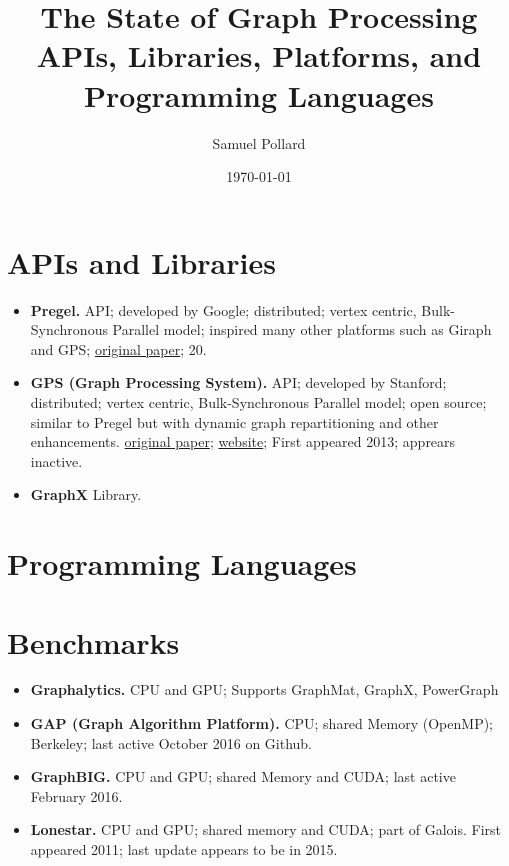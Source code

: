 \documentclass[11pt]{article}
\begin{document}
\title{The State of Graph Processing \\ \large APIs, Libraries, Platforms, and Programming Languages \vspace{-1em}}
\author{Samuel Pollard}
\date{\today}
\maketitle

\section{APIs and Libraries}
\begin{itemize}
	\item \textbf{Pregel.} API; developed by Google; distributed; vertex centric, Bulk-Synchronous Parallel model; inspired many other platforms such as Giraph and GPS; \href{http://dl.acm.org/citation.cfm?id=1807184}{original paper}; 20.
	
	\item \textbf{GPS (Graph Processing System).} API; developed by Stanford; distributed; vertex centric, Bulk-Synchronous Parallel model; open source; similar to Pregel but with dynamic graph repartitioning and other enhancements. \href{http://ilpubs.stanford.edu:8090/1039/7/gps_ssdbm.pdf}{original paper}; \href{http://infolab.stanford.edu/gps/}{website}; First appeared 2013; apprears inactive.
	
	\item \textbf{GraphX} Library.
\end{itemize}

\section{Programming Languages}

\section{Benchmarks}
\begin{itemize}
	\item \textbf{Graphalytics.} CPU and GPU; Supports GraphMat, GraphX, PowerGraph
	\item \textbf{GAP (Graph Algorithm Platform).} CPU; shared Memory (OpenMP); Berkeley; last active October 2016 on Github.
	\item \textbf{GraphBIG.} CPU and GPU; shared Memory and CUDA; last active February 2016.
	\item \textbf{Lonestar.} CPU and GPU; shared memory and CUDA; part of Galois. First appeared 2011; last update appears to be in 2015.
\end{itemize}
\end{document}
